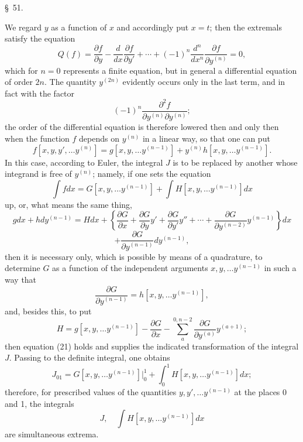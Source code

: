 \documentclass[11pt,a4paper,leqno]{article}
\begin{document}
\begin{center}
{\large \S~51.}
\end{center}

We regard $y$ as a function of $x$ and accordingly put $x=t$; then the extremals satisfy the equation
\begin{equation}\tag{20}
Q(f)=\frac{\partial f}{\partial y}-\frac{d}{dx}\frac{\partial f}{\partial y'}+\cdots+(-1)^n\frac{d^n}{dx^n}\frac{\partial f}{\partial y^{(n)}}=0,
\end{equation}
which for $n=0$ represents a finite equation, but in general a differential equation of order $2n$. The quantity $y^{(2n)}$ evidently occurs only in the last term, and in fact with the factor
\[
(-1)^n\frac{\partial^2f}{\partial y^{(n)}\partial y^{(n)}};
\]
the order of the differential equation is therefore lowered then and only then when the function $f$ depends on $y^{(n)}$ in a linear way, so that one can put
\[
f[x,y,y',\ldots y^{(n)}]=g[x,y,\ldots y^{(n-1)}]+y^{(n)}h[x,y,\ldots y^{(n-1)}].
\]
In this case, according to Euler, the integral $J$ is to be replaced by another whose integrand is free of $y^{(n)}$; namely, if one sets the equation
\begin{equation}\tag{21}
\int fdx=G[x,y,\ldots y^{(n-1)}]+\int H[x,y,\ldots y^{(n-1)}]dx
\end{equation}
up, or, what means the same thing,
\[
gdx+hdy^{(n-1)}=Hdx
+\left\{\frac{\partial G}{\partial x}+\frac{\partial G}{\partial y}y'+\frac{\partial G}{\partial y'}y''+\cdots+\frac{\partial G}{\partial y^{(n-2)}}y^{(n-1)}\right\}dx
\]
\[
+\frac{\partial G}{\partial y^{(n-1)}}dy^{(n-1)},
\]
then it is necessary only, which is possible by means of a quadrature, to determine $G$ as a function of the independent arguments $x,y,\ldots y^{(n-1)}$ in such a way that
\[
\frac{\partial G}{\partial y^{(n-1)}}=h[x,y,\ldots y^{(n-1)}],
\]
and, besides this, to put
\[
H=g[x,y,\ldots y^{(n-1)}]-\frac{\partial G}{\partial x}-\sum_a^{0,n-2}\frac{\partial G}{\partial y^{(a)}}y^{(a+1)};
\]
then equation (21) holds and supplies the indicated transformation of the integral $J$. Passing to the definite integral, one obtains
\[
J_{01}=G[x,y,\ldots y^{(n-1)}]\bigg|_0^1+
\int_0^1H[x,y,\ldots y^{(n-1)}]dx;
\]
therefore, for prescribed values of the quantities $y,y',\ldots y^{(n-1)}$ at the places 0 and 1, the integrals
\[
J,\quad \int H[x,y,\ldots y^{(n-1)}]dx
\]
are simultaneous extrema.
\end{document}
